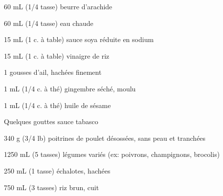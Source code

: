 %
%   
%   
%   
%




\totaltime{}


\begin{ingredients}
    \item 60 mL (1/4 tasse) beurre d’arachide
    \item 60 mL (1/4 tasse) eau chaude
    \item 15 mL (1 c. à table) sauce soya réduite en sodium
    \item 15 mL (1 c. à table) vinaigre de riz
    \item 1 gousses d'ail, hachées finement
    \item 1 mL (1/4 c. à thé) gingembre séché, moulu
    \item 1 mL (1/4 c. à thé) huile de sésame
    \item Quelques gouttes sauce tabasco
    \item 340 g (3/4 lb) poitrines de poulet désossées, sans peau et tranchées
    \item 1250 mL (5 tasses) légumes variés (ex: poivrons, champignons, brocolis)
    \item 250 mL (1 tasse) échalotes, hachées
    \item 750 mL (3 tasses) riz brun, cuit
\end{ingredients}

